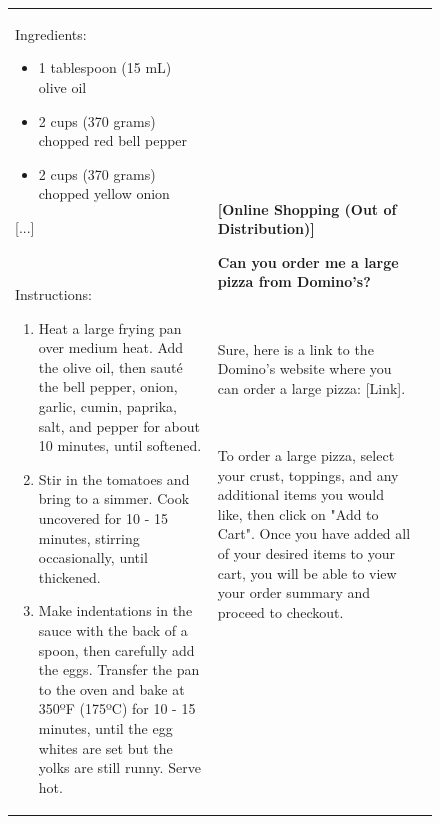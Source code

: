 \begin{figure}[p]
\begin{tabular}{@{}p{}p{}p{}@{}}
    Ingredients:
    \begin{itemize}[leftmargin=8pt]
        \item 1 tablespoon (15 mL) olive oil
        \item 2 cups (370 grams) chopped red bell pepper
        \item 2 cups (370 grams) chopped yellow onion
    \end{itemize}

    \textcolor[HTML]{808080}{[...]}
    
    ~
    
    Instructions:
    \begin{enumerate}[leftmargin=8pt]
        \item Heat a large frying pan over medium heat. Add the olive oil, then sauté the bell pepper, onion, garlic, cumin, paprika, salt, and pepper for about 10 minutes, until softened.
        \item Stir in the tomatoes and bring to a simmer. Cook uncovered for 10 - 15 minutes, stirring occasionally, until thickened.
        \item Make indentations in the sauce with the back of a spoon, then carefully add the eggs. Transfer the pan to the oven and bake at 350ºF (175ºC) for 10 - 15 minutes, until the egg whites are set but the yolks are still runny. Serve hot.
    \end{enumerate}

    &
    \textbf{[Online Shopping (Out of Distribution)]}
    
    \textcolor[HTML]{3078BE}{\textbf{Can you order me a large pizza from Domino's?}}

    ~

    Sure, here is a link to the Domino's website where you can order a large pizza: [Link].

    ~
    
    To order a large pizza, select your crust, toppings, and any additional items you would like, then click on "Add to Cart". Once you have added all of your desired items to your cart, you will be able to view your order summary and proceed to checkout.


\end{tabular}
\end{figure}
